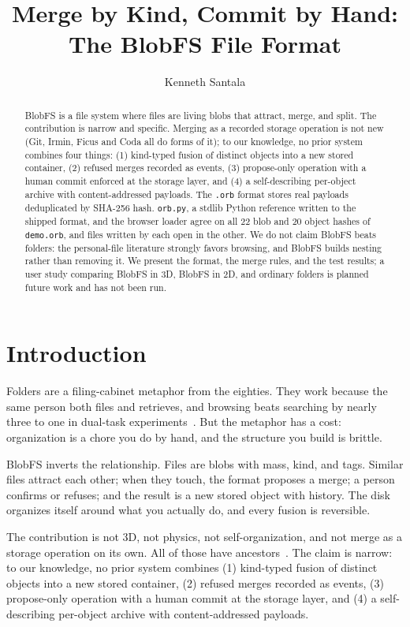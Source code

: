 \documentclass[11pt]{article}
\title{Merge by Kind, Commit by Hand:\\The BlobFS File Format}
\author{Kenneth Santala}
\date{}
\begin{document}
\maketitle

\begin{abstract}
BlobFS is a file system where files are living blobs that attract, merge, and split.
The contribution is narrow and specific.
Merging as a recorded storage operation is not new (Git, Irmin, Ficus and Coda all do forms of it); to our knowledge, no prior system combines four things:
(1) kind-typed fusion of distinct objects into a new stored container,
(2) refused merges recorded as events,
(3) propose-only operation with a human commit enforced at the storage layer, and
(4) a self-describing per-object archive with content-addressed payloads.
The \texttt{.orb} format stores real payloads deduplicated by SHA-256 hash.
\texttt{orb.py}, a stdlib Python reference written to the shipped format, and the browser loader agree on all 22 blob and 20 object hashes of \texttt{demo.orb}, and files written by each open in the other.
We do not claim BlobFS beats folders: the personal-file literature strongly favors browsing, and BlobFS builds nesting rather than removing it.
We present the format, the merge rules, and the test results; a user study comparing BlobFS in 3D, BlobFS in 2D, and ordinary folders is planned future work and has not been run.
\end{abstract}

\section{Introduction}

Folders are a filing-cabinet metaphor from the eighties.
They work because the same person both files and retrieves, and browsing beats searching by nearly three to one in dual-task experiments~\cite{bergman2013}.
But the metaphor has a cost: organization is a chore you do by hand, and the structure you build is brittle.

BlobFS inverts the relationship.
Files are blobs with mass, kind, and tags.
Similar files attract each other; when they touch, the format proposes a merge; a person confirms or refuses; and the result is a new stored object with history.
The disk organizes itself around what you actually do, and every fusion is reversible.

The contribution is not 3D, not physics, not self-organization, and not merge as a storage operation on its own.
All of those have ancestors~\cite{fsnwiki,agarawala2006,mander1992,farinier2015,reiher1994,kumar1995}.
The claim is narrow: to our knowledge, no prior system combines
(1) kind-typed fusion of distinct objects into a new stored container,
(2) refused merges recorded as events,
(3) propose-only operation with a human commit at the storage layer, and
(4) a self-describing per-object archive with content-addressed payloads.
\end{document}
